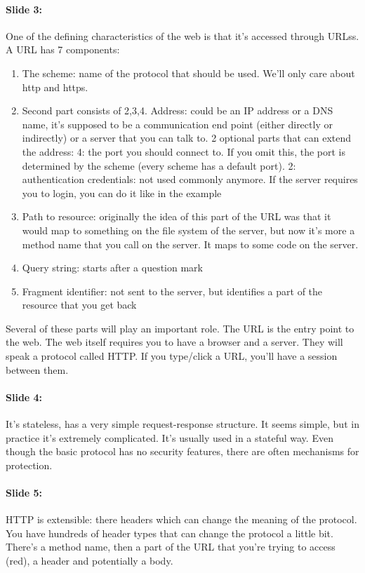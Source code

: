 \documentclass[10pt,a4paper]{report}
\begin{document}
\paragraph{Slide 3:} One of the defining characteristics of the web is that it's accessed through URLss. A URL has 7 components:
\begin{enumerate}
\item The scheme: name of the protocol that should be used. We'll only care about http and https.
\item Second part consists of 2,3,4. Address: could be an IP address or a DNS name, it's supposed to be a communication end point (either directly or indirectly) or a server that you can talk to. 2 optional parts that can extend the address: 4: the port you should connect to. If you omit this, the port is determined by the scheme (every scheme has a default port). 2: authentication credentials: not used commonly anymore. If the server requires you to login, you can do it like in the example
\setcounter{enumi}{4}
\item Path to resource: originally the idea of this part of the URL was that it would map to something on the file system of the server, but now it's more a method name that you call on the server. It maps to some code on the server.
\item Query string: starts after a question mark
\item Fragment identifier: not sent to the server, but identifies a part of the resource that you get back
\end{enumerate}
Several of these parts will play an important role. 
The URL is the entry point to the web. The web itself requires you to have a browser and a server. They will speak a protocol called HTTP. If you type/click a URL, you'll have a session between them.

\paragraph{Slide 4:} It's stateless, has a very simple request-response structure. It seems simple, but in practice it's extremely complicated. It's usually used in a stateful way. Even though the basic protocol has no security features, there are often mechanisms for protection.

\paragraph{Slide 5:} HTTP is extensible: there headers which can change the meaning of the protocol. You have hundreds of header types that can change the protocol a little bit.\\
There's a method name, then a part of the URL that you're trying to access (red), a header and potentially a body.
\end{document}
